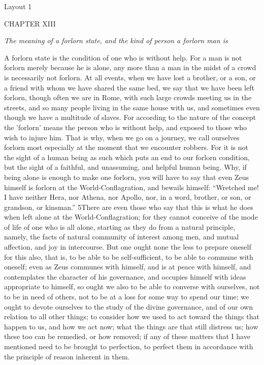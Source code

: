 

Layout 1

CHAPTER XIII

\emph{The meaning of a forlorn state, and the kind of person a forlorn man is}

A forlorn state is the condition of one who is without help. For a man is not forlorn merely because he is alone, any more than a man in the midst of a crowd is necessarily not forlorn. At all events, when we have lost a brother, or a son, or a friend with whom we have shared the same bed, we say that we have been left forlorn, though often we are in Rome, with such large crowds meeting us in the streets, and so many people living in the same house with us, and sometimes even though we have a multitude of slaves. For according to the nature of the concept the 'forlorn' means the person who is without help, and exposed to those who wish to injure him. That is why, when we go on a journey, we call ourselves forlorn most especially at the moment that we encounter robbers. For it is not the sight of a human being as such which puts an end to our forlorn condition, but the sight of a faithful, and unassuming, and helpful human being. Why, if being alone is enough to make one forlorn, you will have to say that even Zeus himself is forlorn at the World-Conflagration, and bewails himself: ``Wretched me! I have neither Hera, nor Athena, nor Apollo, nor, in a word, brother, or son, or grandson, or kinsman.'' 5There are even those who say that this is what he does when left alone at the World-Conflagration; for they cannot conceive of the mode of life of one who is all alone, starting as they do from a natural principle, namely, the facts of natural community of interest among men, and mutual affection, and joy in intercourse. But one ought none the less to prepare oneself for this also, that is, to be able to be self-sufficient, to be able to commune with oneself; even as Zeus communes with himself, and is at peace with himself, and contemplates the character of his governance, and occupies himself with ideas appropriate to himself, so ought we also to be able to converse with ourselves, not to be in need of others, not to be at a loss for some way to spend our time; we ought to devote ourselves to the study of the divine governance, and of our own relation to all other things; to consider how we used to act toward the things that happen to us, and how we act now; what the things are that still distress us; how these too can be remedied, or how removed; if any of these matters that I have mentioned need to be brought to perfection, to perfect them in accordance with the principle of reason inherent in them.

